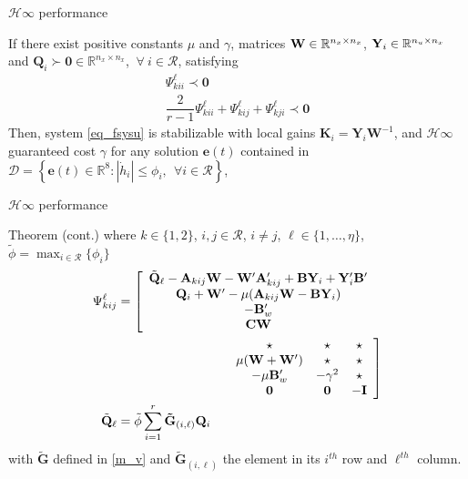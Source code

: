 \begin{frame}{$\mathcal{H}\infty$ performance}
\begin{theorem}
\label{teo2}
If there exist positive constants $\mu$ and $\gamma$, matrices ${\bf W} \in \mathbb{R}^{n_x\times n_x}$, ${\bf Y}_{i} \in \mathbb{R}^{n_u\times n_x}$ and $\mathbf{Q}_{i} \succ \mathbf{0} \in \mathbb{R}^{n_x\times n_x}$, $ ~\forall ~i \in \mathcal{R}$, satisfying 
\begin{align} \label{eq_lmis_teo2}
\Psi^{\ell}_{kii}\prec \mathbf{0}
\\[2mm]
\dfrac{2}{r-1}\Psi^{\ell}_{kii}+\Psi^{\ell}_{kij}+\Psi^{\ell}_{kji}\prec \mathbf{0}
\end{align}
Then, system \eqref{eq_fsysu} is stabilizable with local gains $\mathbf{K}_{i}=\mathbf{Y}_{i}\mathbf W^{-1}$, and $\mathcal{H}\infty$ guaranteed cost $\gamma$ for any solution $\mathbf{e}(t)$ contained in $\mathcal{D}=\left\{\mathbf{e}(t)\in \mathbb{R}^8:|\dot{h}_{i}|\leq \phi_{i},~~\forall i\in \mathcal{R}\right\}$,
\end{theorem}
\end{frame}

\begin{frame}{$\mathcal{H}\infty$ performance}
    \begin{block}{Theorem (cont.)}
    where $k\in\{1,2\}$, $i,j \in \mathcal{R}$, $i \not= j$, $\ell \in \{1,\ldots, \eta\}$, $\displaystyle \tilde{\phi}=\max_{i \in \mathcal{R}} \{\phi_i\}$
    \begin{align*}
\Psi^{\ell}_{kij}&= 
\left[\begin{array}{c}
\tilde{\mathbf{Q}}_\ell-{\bf A}_{kij}{\bf W}-{\bf W}'{\bf A}'_{kij}+{\bf B}{\bf Y}_{i}+{\bf Y}'_{i}{\bf B}'\\
{\bf Q}_{i}+{\bf W}'-\mu({\bf A}_{kij}{\bf W}-{\bf B}{\bf Y}_{i}) \\
-{\bf B}_{w}' \\
{\bf C}{\bf W} 
\end{array}\right.\\
& \hspace{3cm} \left.\begin{array}{ccc}
\star &  \star & \star\\
\mu({\bf W}+{\bf W}') & \star & \star\\
-\mu {\bf B}_{w}' & -\gamma^2 & \star\\
{\bf 0} & {\bf 0} & -{\bf I}
\end{array}\right]\\
\tilde{\mathbf{Q}}_\ell &= \tilde{\phi} \sum^{r}_{i=1}\mathbf{\tilde G}_{(i,\ell)} \mathbf{Q}_i
\end{align*}
with $\mathbf{\tilde G}$ defined in \eqref{m_v} and $\mathbf{\tilde G}_{(i,\ell)}$ the  element in its  $i^{th}$ row and $\ell^{th}$ column.
    \end{block}
\end{frame}

